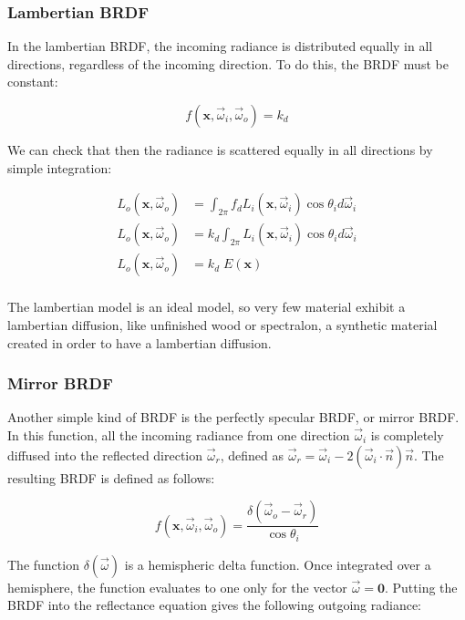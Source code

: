 \subsubsection{Lambertian BRDF}

In the lambertian BRDF, the incoming radiance is distributed equally in all directions, regardless of the incoming direction. To do this, the BRDF must be constant:

$$
f(\mathbf{x}, \vec{\omega}_i, \vec{\omega}_o) = k_d
$$

We can check that then the radiance is scattered equally in all directions by simple integration:

\begin{equation*}
\begin{split}
L_o(\mathbf{x}, \vec{\omega}_o) &= \int_{2\pi} f_d L_i(\mathbf{x}, \vec{\omega}_i) \cos\theta_i d\vec{\omega}_i \\
L_o(\mathbf{x}, \vec{\omega}_o) &= k_d \int_{2\pi} L_i(\mathbf{x}, \vec{\omega}_i) \cos\theta_i d\vec{\omega}_i \\
L_o(\mathbf{x}, \vec{\omega}_o) &= k_d \; E(\mathbf{x}) \\
\end{split}
\end{equation*}

The lambertian model is an ideal model, so very few material exhibit a lambertian diffusion, like unfinished wood or spectralon, a synthetic material created in order to have a lambertian diffusion. 

\subsubsection{Mirror BRDF}

Another simple kind of BRDF is the perfectly specular BRDF, or mirror BRDF. In this function, all the incoming radiance from one direction $\vec{\omega}_i$ is completely diffused into the reflected direction $\vec{\omega}_r$, defined as $\vec{\omega}_r = \vec{\omega}_i - 2 (\vec{\omega}_i \cdot \vec{n}) \vec{n}$. The resulting BRDF is defined as follows:

$$
f(\mathbf{x}, \vec{\omega}_i, \vec{\omega}_o) = \frac{\delta(\vec{\omega}_o - \vec{\omega}_r)}{\cos\theta_i} 
$$

The function $\delta(\vec{\omega})$ is a hemispheric delta function. Once integrated over a hemisphere, the function evaluates to one only for the vector $\vec{\omega} = \mathbf{0}$. Putting the BRDF into the reflectance equation gives the following outgoing radiance:

